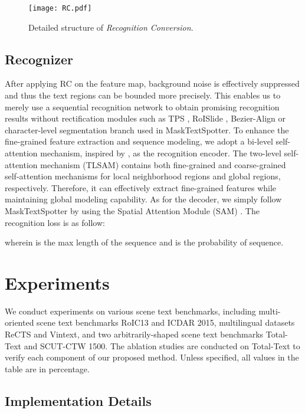 \documentclass[10pt,twocolumn,letterpaper]{article}
\begin{document}
\begin{figure}[t!]
    \centering
    \texttt{[image: RC.pdf]}
    \caption{
        Detailed structure of \textit{Recognition Conversion}.
    }
    \label{fig:recognition conversion}
\end{figure}

\subsection{Recognizer}
\label{sec:recognizer}


After applying RC on the feature map, background noise is effectively suppressed and thus the text regions can be bounded more precisely. 
This enables us to merely use a sequential recognition network to obtain promising recognition results without rectification modules such as TPS \cite{bookstein1989principal}, RoISlide \cite{feng2019textdragon}, Bezier-Align \cite{liu2020abcnet} or character-level segmentation branch used in MaskTextSpotter\cite{liao2019mask}. 
To enhance the fine-grained feature extraction and sequence modeling, we adopt a bi-level self-attention mechanism, inspired by \cite{yang2021focal}, as the recognition encoder. The two-level self-attention mechanism (TLSAM) contains both fine-grained and coarse-grained self-attention mechanisms for local neighborhood regions and global regions, respectively. Therefore, it can effectively extract fine-grained features while maintaining global modeling capability.
As for the decoder, we simply follow MaskTextSpotter by using the Spatial Attention Module (SAM) \cite{liao2020mask}. The recognition loss is as follow:

wherein  is the max length of the sequence and  is the probability of sequence.

\section{Experiments}
We conduct experiments on various scene text benchmarks, including multi-oriented scene text benchmarks RoIC13\cite{liao2020mask} and ICDAR 2015\cite{karatzas2015icdar}, multilingual datasets ReCTS\cite{zhang2019icdar} and Vintext\cite{m_Nguyen-etal-CVPR21}, and two arbitrarily-shaped scene text benchmarks Total-Text\cite{ch2020total} and SCUT-CTW 1500\cite{liu2019curved}. The ablation studies are conducted on Total-Text to verify each component of our proposed method. Unless specified, all values in the table are in percentage.


\subsection{Implementation Details}
\label{Implementation Details}
\end{document}
